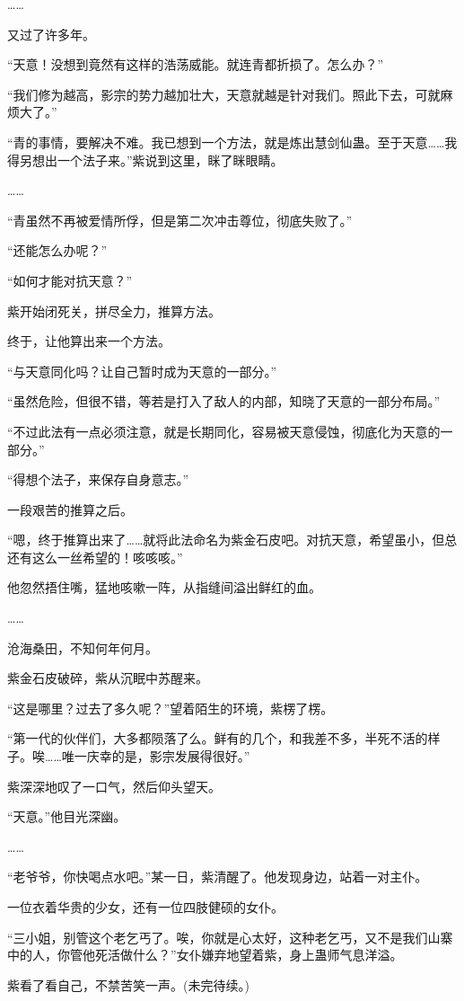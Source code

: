 \begin{this_body}
……

又过了许多年。

“天意！没想到竟然有这样的浩荡威能。就连青都折损了。怎么办？”

“我们修为越高，影宗的势力越加壮大，天意就越是针对我们。照此下去，可就麻烦大了。”

“青的事情，要解决不难。我已想到一个方法，就是炼出慧剑仙蛊。至于天意……我得另想出一个法子来。”紫说到这里，眯了眯眼睛。

……

“青虽然不再被爱情所俘，但是第二次冲击尊位，彻底失败了。”

“还能怎么办呢？”

“如何才能对抗天意？”

紫开始闭死关，拼尽全力，推算方法。

终于，让他算出来一个方法。

“与天意同化吗？让自己暂时成为天意的一部分。”

“虽然危险，但很不错，等若是打入了敌人的内部，知晓了天意的一部分布局。”

“不过此法有一点必须注意，就是长期同化，容易被天意侵蚀，彻底化为天意的一部分。”

“得想个法子，来保存自身意志。”

一段艰苦的推算之后。

“嗯，终于推算出来了……就将此法命名为紫金石皮吧。对抗天意，希望虽小，但总还有这么一丝希望的！咳咳咳。”

他忽然捂住嘴，猛地咳嗽一阵，从指缝间溢出鲜红的血。

……

沧海桑田，不知何年何月。

紫金石皮破碎，紫从沉眠中苏醒来。

“这是哪里？过去了多久呢？”望着陌生的环境，紫楞了楞。

“第一代的伙伴们，大多都陨落了么。鲜有的几个，和我差不多，半死不活的样子。唉……唯一庆幸的是，影宗发展得很好。”

紫深深地叹了一口气，然后仰头望天。

“天意。”他目光深幽。

……

“老爷爷，你快喝点水吧。”某一日，紫清醒了。他发现身边，站着一对主仆。

一位衣着华贵的少女，还有一位四肢健硕的女仆。

“三小姐，别管这个老乞丐了。唉，你就是心太好，这种老乞丐，又不是我们山寨中的人，你管他死活做什么？”女仆嫌弃地望着紫，身上蛊师气息洋溢。

紫看了看自己，不禁苦笑一声。(未完待续。)

\end{this_body}


